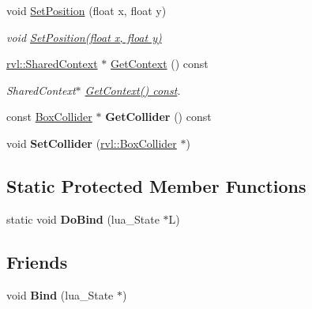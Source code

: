 \begin{DoxyCompactItemize}
void \hyperlink{classrvl_1_1_game_object_afdf86fa461d382882b91d97b028d0de2}{Set\+Position} (float x, float y)
\begin{DoxyCompactList}\small\item\em void \hyperlink{classrvl_1_1_game_object_afdf86fa461d382882b91d97b028d0de2}{Set\+Position(float x, float y)} \end{DoxyCompactList}\item 
\hyperlink{structrvl_1_1_shared_context}{rvl\+::\+Shared\+Context} $\ast$ \hyperlink{classrvl_1_1_game_object_aa03752d8c34914ee01c9e06d2bb661d0}{Get\+Context} () const
\begin{DoxyCompactList}\small\item\em Shared\+Context$\ast$ \hyperlink{classrvl_1_1_game_object_aa03752d8c34914ee01c9e06d2bb661d0}{Get\+Context() const}. \end{DoxyCompactList}\item 
\mbox{\label{classrvl_1_1_game_object_a99c08fec1b6e14fe71af6a71667610c3}} 
const \hyperlink{classrvl_1_1_box_collider_component}{Box\+Collider} $\ast$ {\bfseries Get\+Collider} () const
\item 
\mbox{\label{classrvl_1_1_game_object_ad26188ddf1bc646a5eb42cac148adb96}} 
void {\bfseries Set\+Collider} (\hyperlink{classrvl_1_1_box_collider_component}{rvl\+::\+Box\+Collider} $\ast$)
\end{DoxyCompactItemize}
\subsection*{Static Protected Member Functions}
\begin{DoxyCompactItemize}
\item 
\mbox{\label{classrvl_1_1_game_object_a2e9e7b8f5156013689cd296c0cce4bb6}} 
static void {\bfseries Do\+Bind} (lua\+\_\+\+State $\ast$L)
\end{DoxyCompactItemize}
\subsection*{Friends}
\begin{DoxyCompactItemize}
\item 
\mbox{\label{classrvl_1_1_game_object_a2fe21ef42619f691f13abc7d5555490a}} 
void {\bfseries Bind} (lua\+\_\+\+State $\ast$)
\end{DoxyCompactItemize}


